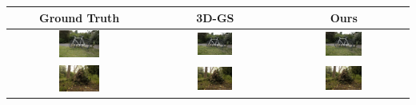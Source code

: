
    \begin{tabular}{ccc}
        \textbf{Ground Truth} & \textbf{3D-GS} & \textbf{Ours} \\ \hline
            \includegraphics[width=0.3\textwidth]{../o-3dgs/eval/bicycle/test/ours_30000/gt/00000.png} &
            \includegraphics[width=0.3\textwidth]{../o-3dgs/eval/bicycle/test/ours_30000/renders/00000.png} & 
            \includegraphics[width=0.3\textwidth]{../o-3dgs/eval/bicycle/test/ours_30000/renders/00000.png} \\
            \includegraphics[width=0.3\textwidth]{../o-3dgs/eval/stump/test/ours_30000/gt/00000.png} &
            \includegraphics[width=0.3\textwidth]{../o-3dgs/eval/stump/test/ours_30000/renders/00000.png} & 
            \includegraphics[width=0.3\textwidth]{../o-3dgs/eval/stump/test/ours_30000/renders/00000.png} \\

\end{tabular}
